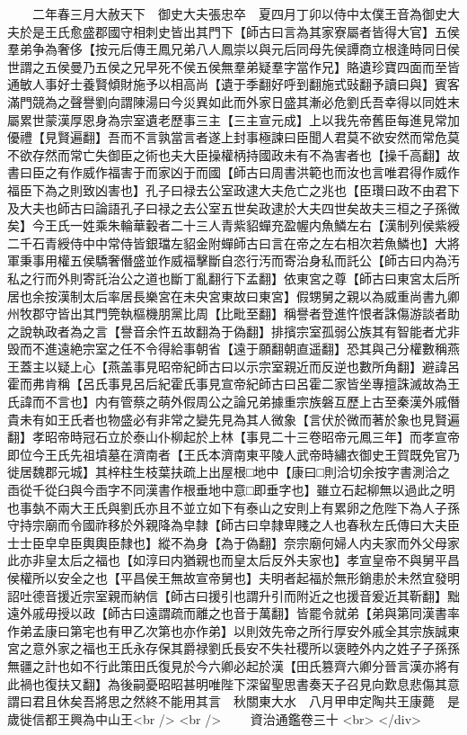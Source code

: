 　　二年春三月大赦天下　御史大夫張忠卒　夏四月丁卯以侍中太僕王音為御史大夫於是王氏愈盛郡國守相刺史皆出其門下【師古曰言為其家寮屬者皆得大官】五侯羣弟争為奢侈【按元后傳王鳳兄弟八人鳳崇以與元后同母先侯譚商立根逢時同日侯世謂之五侯曼乃五侯之兄早死不侯五侯無羣弟疑羣字當作兄】賂遺珍寶四面而至皆通敏人事好士養賢傾財施予以相高尚【遺于季翻好呼到翻施式䜴翻予讀曰與】賓客滿門競為之聲譽劉向謂陳湯曰今災異如此而外家日盛其漸必危劉氏吾幸得以同姓末屬累世蒙漢厚恩身為宗室遺老歷事三主【三主宣元成】上以我先帝舊臣每進見常加優禮【見賢遍翻】吾而不言孰當言者遂上封事極諫曰臣聞人君莫不欲安然而常危莫不欲存然而常亡失御臣之術也夫大臣操權柄持國政未有不為害者也【操千高翻】故書曰臣之有作威作福害于而家凶于而國【師古曰周書洪範也而汝也言唯君得作威作福臣下為之則致凶害也】孔子曰禄去公室政逮大夫危亡之兆也【臣瓚曰政不由君下及大夫也師古曰論語孔子曰禄之去公室五世矣政逮於大夫四世矣故夫三桓之子孫微矣】今王氏一姓乘朱輪華轂者二十三人青紫貂蟬充盈幄内魚鱗左右【漢制列侯紫綬二千石青綬侍中中常侍皆銀璫左貂金附蟬師古曰言在帝之左右相次若魚鱗也】大將軍秉事用權五侯驕奢僭盛並作威福擊斷自恣行汚而寄治身私而託公【師古曰内為汚私之行而外則寄託治公之道也斷丁亂翻行下孟翻】依東宮之尊【師古曰東宮太后所居也余按漢制太后率居長樂宮在未央宮東故曰東宮】假甥舅之親以為威重尚書九卿州牧郡守皆出其門筦執樞機朋黨比周【比毗至翻】稱譽者登進忤恨者誅傷游談者助之說執政者為之言【譽音余忤五故翻為于偽翻】排擯宗室孤弱公族其有智能者尤非毁而不進遠絶宗室之任不令得給事朝省【遠于願翻朝直遥翻】恐其與己分權數稱燕王蓋主以疑上心【燕盖事見昭帝紀師古曰以示宗室親近而反逆也數所角翻】避諱呂霍而弗肯稱【呂氏事見呂后紀霍氏事見宣帝紀師古曰呂霍二家皆坐專擅誅滅故為王氏諱而不言也】内有管蔡之萌外假周公之論兄弟據重宗族磐互歷上古至秦漢外戚僭貴未有如王氏者也物盛必有非常之變先見為其人微象【言伏於微而著於象也見賢遍翻】孝昭帝時冠石立於泰山仆柳起於上林【事見二十三卷昭帝元鳳三年】而孝宣帝即位今王氏先祖墳墓在濟南者【王氏本濟南東平陵人武帝時繡衣御史王賀既免官乃徙居魏郡元城】其梓柱生枝葉扶疏上出屋根□地中【康曰□則洽切余按字書測洽之臿從千從臼與今臿字不同漢書作根垂地中意□即垂字也】雖立石起柳無以過此之明也事埶不兩大王氏與劉氏亦且不並立如下有泰山之安則上有累卵之危陛下為人子孫守持宗廟而令國祚移於外親降為皁隸【師古曰皁隸卑賤之人也春秋左氏傳曰大夫臣士士臣皁皁臣輿輿臣隸也】縱不為身【為于偽翻】奈宗廟何婦人内夫家而外父母家此亦非皇太后之福也【如淳曰内猶親也而皇太后反外夫家也】孝宣皇帝不與舅平昌侯權所以安全之也【平昌侯王無故宣帝舅也】夫明者起福於無形銷患於未然宜發明詔吐德音援近宗室親而納信【師古曰援引也謂升引而附近之也援音爰近其靳翻】黜遠外戚毋授以政【師古曰遠謂疏而離之也音于萬翻】皆罷令就弟【弟與第同漢書率作弟孟康曰第宅也有甲乙次第也亦作弟】以則效先帝之所行厚安外戚全其宗族誠東宮之意外家之福也王氏永存保其爵禄劉氏長安不失社稷所以褒睦外内之姓子子孫孫無疆之計也如不行此策田氏復見於今六卿必起於漢【田氏篡齊六卿分晉言漢亦將有此禍也復扶又翻】為後嗣憂昭昭甚明唯陛下深留聖思書奏天子召見向歎息悲傷其意謂曰君且休矣吾將思之然終不能用其言　秋關東大水　八月甲申定陶共王康薨　是歲徙信都王興為中山王<br />
<br />
　　資治通鑑卷三十  <br>
   </div> 

